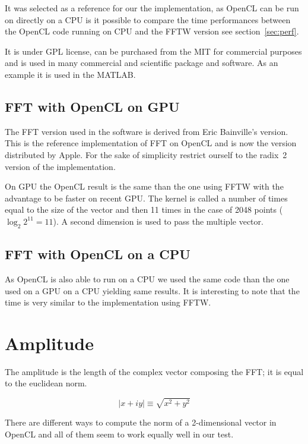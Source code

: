    	It was selected as a reference for our the implementation, as \gls{OpenCL} can be run on directly on a \gls{CPU} is it possible to compare the time performances between the \gls{OpenCL} code running on \gls{CPU} and the \gls{FFTW} version see section~\ref{sec:perf}.

   	It is under GPL license, can be purchased from the \gls{MIT} for commercial purposes and is used in many commercial and scientific package and software. As an example it is used in the MATLAB.

   	\subsection{FFT with OpenCL on GPU}

   	The \gls{FFT} version used in the software is derived from Eric Bainville's version. This is the reference implementation of \gls{FFT} on \gls{OpenCL} and is now the version distributed by Apple\cite{bainville11}. For the sake of simplicity restrict ourself to the radix~2 version of the implementation.

   	On \gls{GPU} the \gls{OpenCL} result is the same than the one using \gls{FFTW} with the advantage to be faster on recent \gls{GPU}. The kernel is called a number of times equal to the size of the vector and then 11 times in the case of 2048 points ($\log_{2}{2^{11}} = 11$). A second dimension is used to pass the multiple vector.

   	\subsection{FFT with OpenCL on a CPU}

   	As \gls{OpenCL} is also able to run on a \gls{CPU} we used the same code than the one used on a \gls{GPU} on a \gls{CPU} yielding same results. It is interesting to note that the time is very similar to the implementation using \gls{FFTW}.

\section{Amplitude}
\label{sec:amplitude}

The amplitude is the length of the complex vector composing the \gls{FFT}; it is equal to the euclidean norm. 

$$ \mid x + i y \mid \equiv \sqrt{x^2 + y^2}$$ 

There are different ways to compute the norm of a 2-dimensional vector in \gls{OpenCL} and all of them seem to work equally well in our test.

